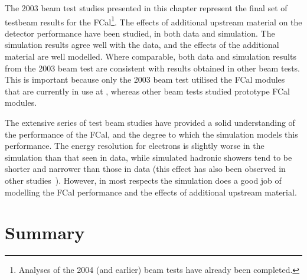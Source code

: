 %


The 2003 beam test studies presented in this chapter represent the final set of testbeam results for the FCal\footnote{ Analyses of the 2004 (and earlier) beam tests have already been completed.}. The effects of additional upstream material on the detector performance have been studied, in both data and simulation. The simulation results agree well with the data, and the effects of the additional material are well modelled. Where comparable, both data and simulation results from the 2003 beam test are consistent with results obtained in other beam tests. This is important because only the 2003 beam test utilised the FCal modules that are currently in use at \atlas, whereas other beam tests studied prototype FCal modules. 

The extensive series of test beam studies have provided a solid understanding of the performance of the FCal, and the degree to which the \atlas simulation models this performance. The energy resolution for electrons is slightly worse in the simulation than that seen in data, while simulated hadronic showers tend to be shorter and narrower than those in data (this effect has also been observed in other studies~\cite{calpub2010}). However, in most respects the simulation does a good job of modelling the FCal performance and the effects of additional upstream material. 

%
%
%
%














\section{Summary}

